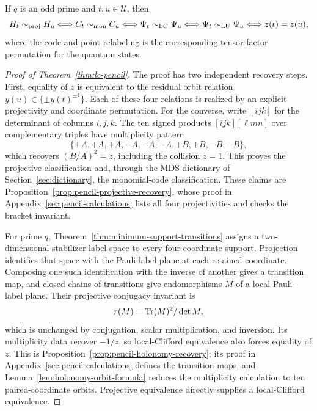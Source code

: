 \begin{corollary}
\label{cor:lu-lc-pencil}
If \(q\) is an odd prime and \(t,u\in\mathcal U\), then
\[
 H_t\sim_{\mathrm{proj}}H_u
 \Longleftrightarrow C_t\sim_{\mathrm{mon}}C_u
 \Longleftrightarrow \Psi_t\sim_{\mathrm{LC}}\Psi_u
 \Longleftrightarrow \Psi_t\sim_{\mathrm{LU}}\Psi_u
 \Longleftrightarrow z(t)=z(u),
\]
where the code and point relabeling is the corresponding tensor-factor
permutation for the quantum states.
\end{corollary}

\AMEFigureSix

\begin{proof}[Proof of Theorem~\ref{thm:lc-pencil}]
The proof has two independent recovery steps.  First, equality of \(z\) is
equivalent to the residual orbit relation
\(y(u)\in\{\pm y(t)^{\pm1}\}\).  Each of these four relations is realized by
an explicit projectivity and coordinate permutation.  For the converse,
write \([ijk]\) for the determinant of columns \(i,j,k\).  The ten signed
products \([ijk][\ell mn]\) over complementary triples have multiplicity
pattern
\[
 \{+A,+A,+A,-A,-A,-A,+B,+B,-B,-B\},
\]
which recovers \((B/A)^2=z\), including the collision \(z=1\).  This proves
the projective classification and, through the MDS dictionary of
Section~\ref{sec:dictionary}, the monomial-code classification.  These
claims are Proposition~\ref{prop:pencil-projective-recovery}, whose proof in
Appendix~\ref{sec:pencil-calculations} lists all four projectivities and
checks the bracket invariant.

For prime \(q\), Theorem~\ref{thm:minimum-support-transitions} assigns a
two-dimensional stabilizer-label space to every four-coordinate support.
Projection identifies that space with the Pauli-label plane at each retained
coordinate.  Composing one such identification with the inverse of another
gives a transition map, and closed chains of transitions give endomorphisms
\(M\) of a local Pauli-label plane.  Their projective conjugacy invariant is
\[
 r(M)=\operatorname{Tr}(M)^2/\det M,
\]
which is unchanged by conjugation, scalar multiplication, and inversion.
Its multiplicity data recover \(-1/z\), so local-Clifford equivalence also
forces equality of \(z\).  This is
Proposition~\ref{prop:pencil-holonomy-recovery}; its proof in
Appendix~\ref{sec:pencil-calculations} defines the transition maps, and
Lemma~\ref{lem:holonomy-orbit-formula} reduces the multiplicity calculation
to ten paired-coordinate orbits.  Projective equivalence directly supplies a
local-Clifford equivalence.
\end{proof}

